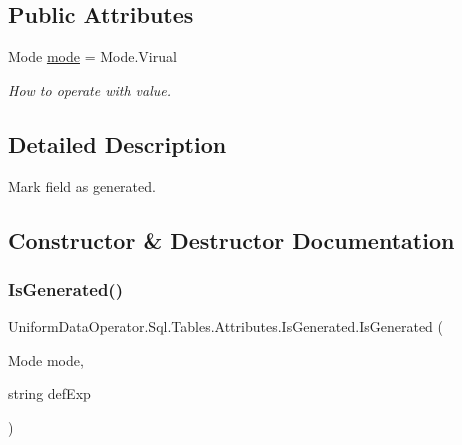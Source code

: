 \subsection*{Public Attributes}
\begin{DoxyCompactItemize}
\item 
Mode \mbox{\hyperlink{class_uniform_data_operator_1_1_sql_1_1_tables_1_1_attributes_1_1_is_generated_af3fa1eea5f12c0a0f8128b794df15b78}{mode}} = Mode.\+Virual
\begin{DoxyCompactList}\small\item\em How to operate with value. \end{DoxyCompactList}\end{DoxyCompactItemize}


\subsection{Detailed Description}
Mark field as generated. 



\subsection{Constructor \& Destructor Documentation}
\mbox{\label{class_uniform_data_operator_1_1_sql_1_1_tables_1_1_attributes_1_1_is_generated_ae7a7020b285f0208b1ec1e19bbee3814}} 
\subsubsection{\texorpdfstring{Is\+Generated()}{IsGenerated()}}
{\footnotesize\ttfamily Uniform\+Data\+Operator.\+Sql.\+Tables.\+Attributes.\+Is\+Generated.\+Is\+Generated (\begin{DoxyParamCaption}\item[{Mode}]{mode,  }\item[{string}]{def\+Exp }\end{DoxyParamCaption})}



